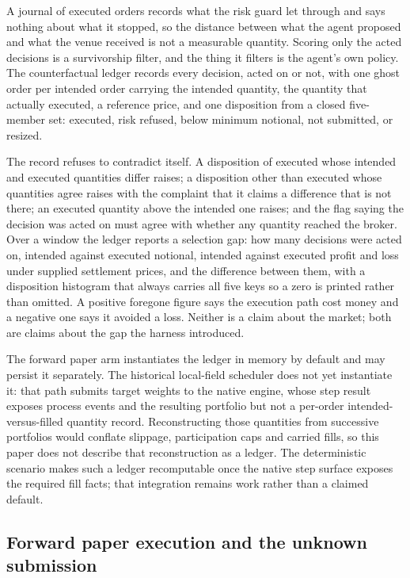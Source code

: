 A journal of executed orders records what the risk guard let through and says nothing about what it stopped, so the distance between what the agent proposed and what the venue received is not a measurable quantity. Scoring only the acted decisions is a survivorship filter, and the thing it filters is the agent's own policy. The counterfactual ledger records every decision, acted on or not, with one ghost order per intended order carrying the intended quantity, the quantity that actually executed, a reference price, and one disposition from a closed five-member set: executed, risk refused, below minimum notional, not submitted, or resized.

The record refuses to contradict itself. A disposition of executed whose intended and executed quantities differ raises; a disposition other than executed whose quantities agree raises with the complaint that it claims a difference that is not there; an executed quantity above the intended one raises; and the flag saying the decision was acted on must agree with whether any quantity reached the broker. Over a window the ledger reports a selection gap: how many decisions were acted on, intended against executed notional, intended against executed profit and loss under supplied settlement prices, and the difference between them, with a disposition histogram that always carries all five keys so a zero is printed rather than omitted. A positive foregone figure says the execution path cost money and a negative one says it avoided a loss. Neither is a claim about the market; both are claims about the gap the harness introduced.

The forward paper arm instantiates the ledger in memory by default and may persist it separately. The historical local-field scheduler does not yet instantiate it: that path submits target weights to the native engine, whose step result exposes process events and the resulting portfolio but not a per-order intended-versus-filled quantity record. Reconstructing those quantities from successive portfolios would conflate slippage, participation caps and carried fills, so this paper does not describe that reconstruction as a ledger. The deterministic scenario makes such a ledger recomputable once the native step surface exposes the required fill facts; that integration remains work rather than a claimed default.

\subsection{Forward paper execution and the unknown submission}\label{sec:forward-paper}

